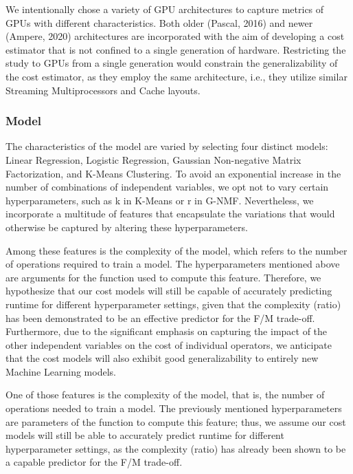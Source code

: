 We intentionally chose a variety of GPU architectures to capture metrics of GPUs with different characteristics. Both older (Pascal, 2016) and newer (Ampere, 2020) architectures are incorporated with the aim of developing a cost estimator that is not confined to a single generation of hardware. Restricting the study to GPUs from a single generation would constrain the generalizability of the cost estimator, as they employ the same architecture, i.e., they utilize similar Streaming Multiprocessors and Cache layouts.

\subsubsection{Model}
The characteristics of the model are varied by selecting four distinct models: Linear Regression, Logistic Regression, Gaussian Non-negative Matrix Factorization, and K-Means Clustering. To avoid an exponential increase in the number of combinations of independent variables, we opt not to vary certain hyperparameters, such as k in K-Means or r in G-NMF. Nevertheless, we incorporate a multitude of features that encapsulate the variations that would otherwise be captured by altering these hyperparameters.

Among these features is the complexity of the model, which refers to the number of operations required to train a model. The hyperparameters mentioned above are arguments for the function used to compute this feature. Therefore, we hypothesize that our cost models will still be capable of accurately predicting runtime for different hyperparameter settings, given that the complexity (ratio) has been demonstrated to be an effective predictor for the F/M trade-off. Furthermore, due to the significant emphasis on capturing the impact of the other independent variables on the cost of individual operators, we anticipate that the cost models will also exhibit good generalizability to entirely new Machine Learning models.

One of those features is the complexity of the model, that is, the number of operations needed to train a model. The previously mentioned hyperparameters are parameters of the function to compute this feature; thus, we assume our cost models will still be able to accurately predict runtime for different hyperparameter settings, as the complexity (ratio) has already been shown to be a capable predictor for the F/M trade-off.

